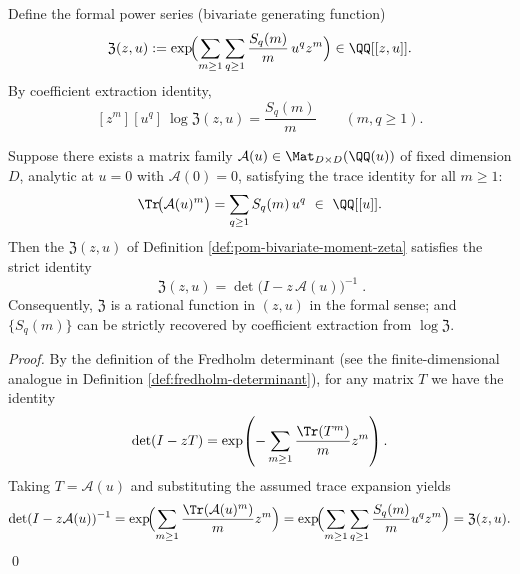 \begin{definition}\label{def:pom-bivariate-moment-zeta}
Define the formal power series (bivariate generating function)
\[
\mathfrak{Z}(z,u)
:=\exp\!\Bigl(\sum_{m\ge 1}\sum_{q\ge 1}\frac{S_q(m)}{m}\,u^{q}z^{m}\Bigr)
\in \QQ[[z,u]].
\]
By coefficient extraction identity,
\[
[z^m][u^q]\ \log\mathfrak{Z}(z,u)=\frac{S_q(m)}{m}\qquad(m,q\ge 1).
\]
\end{definition}

\begin{theorem}\label{thm:pom-bivariate-moment-zeta-fredholm}
Suppose there exists a matrix family \(\mathcal{A}(u)\in\Mat_{D\times D}(\QQ(u))\) of fixed dimension \(D\), analytic at \(u=0\) with \(\mathcal{A}(0)=0\), satisfying the trace identity for all \(m\ge 1\):
\[
\Tr\!\bigl(\mathcal{A}(u)^m\bigr)=\sum_{q\ge 1} S_q(m)\,u^{q}\ \in\ \QQ[[u]].
\]
Then the \(\mathfrak{Z}(z,u)\) of Definition \ref{def:pom-bivariate-moment-zeta} satisfies the strict identity
\[
\boxed{\;
\mathfrak{Z}(z,u)=\det\bigl(I-z\,\mathcal{A}(u)\bigr)^{-1}\; }.
\]
Consequently, \(\mathfrak{Z}\) is a rational function in \((z,u)\) in the formal sense; and \(\{S_q(m)\}\) can be strictly recovered by coefficient extraction from \(\log\mathfrak{Z}\).
\end{theorem}
\begin{proof}
By the definition of the Fredholm determinant (see the finite-dimensional analogue in Definition \ref{def:fredholm-determinant}), for any matrix \(T\) we have the identity
\[
\det(I-zT)=\exp\!\left(-\sum_{m\ge 1}\frac{\Tr(T^m)}{m}z^m\right).
\]
Taking \(T=\mathcal{A}(u)\) and substituting the assumed trace expansion yields
\[
\det(I-z\mathcal{A}(u))^{-1}
=\exp\!\Bigl(\sum_{m\ge 1}\frac{\Tr(\mathcal{A}(u)^m)}{m}z^m\Bigr)
=\exp\!\Bigl(\sum_{m\ge 1}\sum_{q\ge 1}\frac{S_q(m)}{m}u^q z^m\Bigr)
=\mathfrak{Z}(z,u).
\]
\qed
\end{proof}

